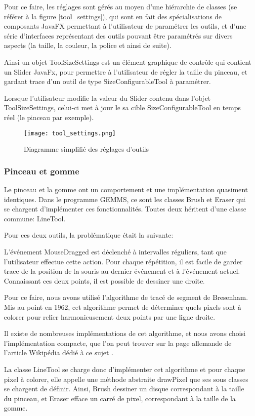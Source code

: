 Pour ce faire, les réglages sont gérés au moyen d'une hiérarchie de classes (se référer à la figure \ref{tool_settings}), qui sont en fait des spécialisations de composants JavaFX permettant à l'utilisateur de paramétrer les outils, et d'une série d'interfaces représentant des outils pouvant être paramétrés sur divers aspects (la taille, la couleur, la police et ainsi de suite).
\par
Ainsi un objet ToolSizeSettings est un élément graphique de contrôle qui contient un Slider JavaFx, pour permettre à l'utilisateur de régler la taille du pinceau, et gardant trace d'un outil de type SizeConfigurableTool à paramétrer.
\par 
Lorsque l'utilisateur modifie la valeur du Slider contenu dans l'objet ToolSizeSettings, celui-ci met à jour le sa cible SizeConfigurableTool en temps réel (le pinceau par exemple).

\begin{figure}[h]
	\caption{Diagramme simplifié des réglages d'outils}
	\centering
	\texttt{[image: tool\_settings.png]}
	\label{fig:tool_settings}
\end{figure}

\subsubsection{Pinceau et gomme}
Le pinceau et la gomme ont un comportement et une implémentation quasiment identiques. Dans le programme GEMMS, ce sont les classes Brush et Eraser qui se chargent d'implémenter ces fonctionnalités. Toutes deux héritent d'une classe commune: LineTool. 
\par
Pour ces deux outils, la problématique était la suivante: 
\par 
L'événement MouseDragged est déclenché à intervalles réguliers, tant que l'utilisateur effectue cette action. Pour chaque répétition, il est facile de garder trace de la position de la souris au dernier événement et à l'événement actuel. Connaissant ces deux points, il est possible de dessiner une droite.
\par
Pour ce faire, nous avons utilisé l'algorithme de tracé de segment de Bresenham. Mis au point en 1962, cet algorithme permet de déterminer quels pixels sont à colorer pour relier harmonieusement deux points par une ligne droite.
\par
Il existe de nombreuses implémentations de cet algorithme, et nous avons choisi l'implémentation compacte, que l'on peut trouver sur la page allemande de l'article Wikipédia dédié à ce sujet \cite{Bresenham}.
\par
La classe LineTool se charge donc d'implémenter cet algorithme et pour chaque pixel à colorer, elle appelle une méthode abstraite drawPixel que ses sous classes se chargent de définir. Ainsi, Brush dessiner un disque correspondant à la taille du pinceau, et Eraser efface un carré de pixel, correspondant à la taille de la gomme.
